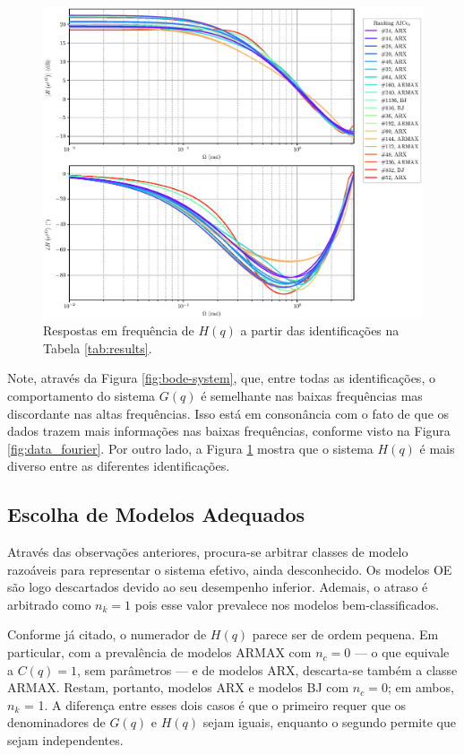 \documentclass{ppgeesa}
\begin{document}
\begin{figure}[!htbp]
  \centering
  \includegraphics[width=\linewidth]{bode_H_AICCv}
  \caption{Respostas em frequência de $H(q)$ a partir das identificações na Tabela \ref{tab:results}.}
  \label{fig:bode-noise}
\end{figure}

Note, através da Figura \ref{fig:bode-system}, que, entre todas as identificações, o comportamento do sistema $G(q)$ é semelhante nas baixas frequências mas discordante nas altas frequências.
Isso está em consonância com o fato de que os dados trazem mais informações nas baixas frequências, conforme visto na Figura \ref{fig:data_fourier}.
Por outro lado, a Figura \ref{fig:bode-noise} mostra que o sistema $H(q)$ é mais diverso entre as diferentes identificações.

\subsection{Escolha de Modelos Adequados}
Através das observações anteriores, procura-se arbitrar classes de modelo razoáveis para representar o sistema efetivo, ainda desconhecido.
Os modelos OE são logo descartados devido ao seu desempenho inferior.
Ademais, o atraso é arbitrado como $n_k = 1$ pois esse valor prevalece nos modelos bem-classificados.

Conforme já citado, o numerador de $H(q)$ parece ser de ordem pequena.
Em particular, com a prevalência de modelos ARMAX com $n_c = 0$ --- o que equivale a $C(q) = 1$, sem parâmetros --- e de modelos ARX, descarta-se também a classe ARMAX.
Restam, portanto, modelos ARX e modelos BJ com $n_c = 0$; em ambos, $n_k$ = 1.
A diferença entre esses dois casos é que o primeiro requer que os denominadores de $G(q)$ e $H(q)$ sejam iguais, enquanto o segundo permite que sejam independentes.
\end{document}
